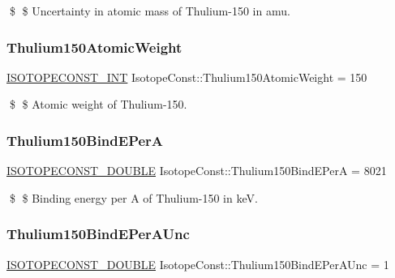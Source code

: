 \$ \$ Uncertainty in atomic mass of Thulium-\/150 in amu. \mbox{\label{group___isotope_const-_thulium-_tm150_ga3f472dc27a5a1fdf3734dee21bca418b}} 
\subsubsection{\texorpdfstring{Thulium150\+Atomic\+Weight}{Thulium150AtomicWeight}}
{\footnotesize\ttfamily \mbox{\hyperlink{group___isotope_const-_macros_ga5f18360b3e99483a35c32d789e62621c}{I\+S\+O\+T\+O\+P\+E\+C\+O\+N\+S\+T\+\_\+\+I\+NT}} Isotope\+Const\+::\+Thulium150\+Atomic\+Weight = 150}

\$ \$ Atomic weight of Thulium-\/150. \mbox{\label{group___isotope_const-_thulium-_tm150_gad3332180de13ae7e9e4c3cbd4411b1c3}} 
\subsubsection{\texorpdfstring{Thulium150\+Bind\+E\+PerA}{Thulium150BindEPerA}}
{\footnotesize\ttfamily \mbox{\hyperlink{group___isotope_const-_macros_ga8f45a7272ce02c0b4c65c44636ed719a}{I\+S\+O\+T\+O\+P\+E\+C\+O\+N\+S\+T\+\_\+\+D\+O\+U\+B\+LE}} Isotope\+Const\+::\+Thulium150\+Bind\+E\+PerA = 8021}

\$ \$ Binding energy per A of Thulium-\/150 in keV. \mbox{\label{group___isotope_const-_thulium-_tm150_ga10dc2c2ee8cbeb21cbdb2323b869c9a1}} 
\subsubsection{\texorpdfstring{Thulium150\+Bind\+E\+Per\+A\+Unc}{Thulium150BindEPerAUnc}}
{\footnotesize\ttfamily \mbox{\hyperlink{group___isotope_const-_macros_ga8f45a7272ce02c0b4c65c44636ed719a}{I\+S\+O\+T\+O\+P\+E\+C\+O\+N\+S\+T\+\_\+\+D\+O\+U\+B\+LE}} Isotope\+Const\+::\+Thulium150\+Bind\+E\+Per\+A\+Unc = 1}

